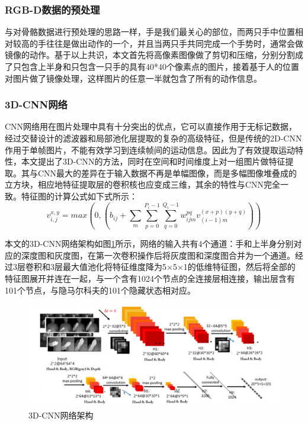 \documentclass[a4paper, 12pt]{article}
\begin{document}
\subsubsection{RGB-D数据的预处理}
与对骨骼数据进行预处理的思路一样，手是我们最关心的部位，而两只手中位置相对较高的手往往是做出动作的一个，并且当两只手共同完成一个手势时，通常会做镜像的动作。基于以上共识，本文首先将高像素图像做了剪切和压缩，分别分割成了只包含上半身和只包含一只手的具有40*40个像素点的图片，接着基于人的位置对图片做了镜像处理，这样图片的任意一半就包含了所有的动作信息。

\subsubsection{3D-CNN网络}
CNN网络用在图片处理中具有十分突出的优点，它可以直接作用于无标记数据，经过交替设计的滤波器和局部池化层提取的复杂的高级特征，但是传统的2D-CNN作用于单帧图片，不能有效学习到连续帧间的运动信息\cite{p7}。因此为了有效提取运动特性，本文提出了3D-CNN的方法，同时在空间和时间维度上对一组图片做特征提取。其与CNN最大的差异在于输入数据不再是单幅图像，而是多幅图像堆叠成的立方块，相应地特征提取层的卷积核也应变成三维，其余的特性与CNN完全一致。特征图的计算公式如下式所示：
\begin{equation}
  v_{i,j}^{x,y} = max(0, (b_{ij} + \sum_m \sum_{p=0}^{P_i-1} \sum_{q=0}^{Q_i-1} w_{ijm}^{pq}v_{(i-1)m}^{(x+p)(y+q)}))
\end{equation}

本文的3D-CNN网络架构如图\ref{fig:3}所示，网络的输入共有4个通道：手和上半身分别对应的深度图和灰度图，在第一次卷积操作后将灰度图和深度图合并为一个通道。经过3层卷积和3层最大值池化将特征维度降为5×5×1的低维特征图，然后将全部的特征图展开并连在一起，与一个含有1024个节点的全连接层相连接，输出层含有101个节点，与隐马尔科夫的101个隐藏状态相对应。
\begin{figure}[ht]
  \centering
  \includegraphics[width=14cm]{cnnArchitecture.png}
  \caption{\label{fig:3}3D-CNN网络架构}
\end{figure}
\end{document}
